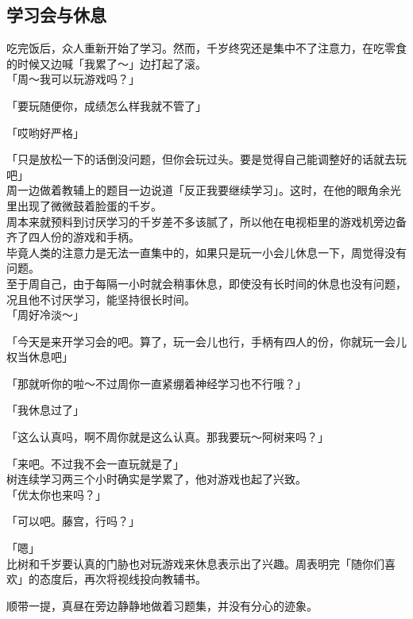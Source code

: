 \subsection{学习会与休息}

吃完饭后，众人重新开始了学习。然而，千岁终究还是集中不了注意力，在吃零食的时候又边喊「我累了～」边打起了滚。\\

「周～我可以玩游戏吗？」

「要玩随便你，成绩怎么样我就不管了」

「哎哟好严格」

「只是放松一下的话倒没问题，但你会玩过头。要是觉得自己能调整好的话就去玩吧」\\

周一边做着教辅上的题目一边说道「反正我要继续学习」。这时，在他的眼角余光里出现了微微鼓着脸蛋的千岁。\\

周本来就预料到讨厌学习的千岁差不多该腻了，所以他在电视柜里的游戏机旁边备齐了四人份的游戏和手柄。\\

毕竟人类的注意力是无法一直集中的，如果只是玩一小会儿休息一下，周觉得没有问题。\\

至于周自己，由于每隔一小时就会稍事休息，即使没有长时间的休息也没有问题，况且他不讨厌学习，能坚持很长时间。\\

「周好冷淡～」

「今天是来开学习会的吧。算了，玩一会儿也行，手柄有四人的份，你就玩一会儿权当休息吧」

「那就听你的啦～不过周你一直紧绷着神经学习也不行哦？」

「我休息过了」

「这么认真吗，啊不周你就是这么认真。那我要玩～阿树来吗？」

「来吧。不过我不会一直玩就是了」\\

树连续学习两三个小时确实是学累了，他对游戏也起了兴致。\\

「优太你也来吗？」

「可以吧。藤宫，行吗？」

「嗯」\\

比树和千岁要认真的门胁也对玩游戏来休息表示出了兴趣。周表明完「随你们喜欢」的态度后，再次将视线投向教辅书。

顺带一提，真昼在旁边静静地做着习题集，并没有分心的迹象。\\

